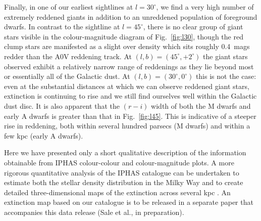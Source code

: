 \documentclass[useAMS,usenatbib]{mn2e}
\begin{document}
Finally, in one of our earliest sightlines at $l=30^{\circ}$,
we find a very high number of extremely reddened giants
in addition to an unreddened population
of foreground dwarfs.
In contrast to the sightline at $l=45^{\circ}$,
there is no clear group of giant stars visible
in the colour-magnitude diagram of Fig.~\ref{fig:l30},
though the red clump stars are manifested as a slight over density
which sits roughly 0.4~mags redder than the A0V reddening track.
At $(l,b)=(45^{\circ}, +2^{\circ})$ the giant stars observed
exhibit a relatively narrow range of reddenings
as they lie beyond most or essentially all of the Galactic dust.
At $(l,b)=(30^{\circ}, 0^{\circ})$ this is not the case:
even at the substantial distances
at which we can observe reddened giant stars,
extinction is continuing to rise
and we still find ourselves well within the Galactic dust disc.
It is also apparent that the $(r-i)$ width of both the M dwarfs
and early A dwarfs is greater than that in Fig.~\ref{fig:l45}.
This is indicative of a steeper rise in reddening,
both within several hundred parsecs (M dwarfs)
and within a few kpc (early A dwarfs).

Here we have presented only a short qualitative description
of the information obtainable
from IPHAS colour-colour and colour-magnitude plots.
A more rigorous quantitative analysis of the IPHAS catalogue
can be undertaken to estimate both
the stellar density distribution in the Milky Way \citep{Sale2010}
and to create detailed three-dimensional maps
of the extinction across several kpc \citep{Sale2009,Sale2012}.
An extinction map based on our catalogue
is to be released in a separate paper
that accompanies this data release (Sale et al., in preparation).
\end{document}
